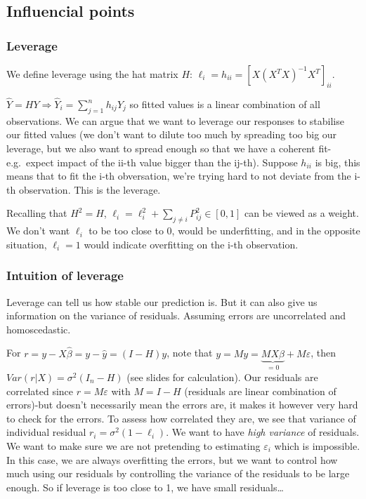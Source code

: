 \documentclass[
]{article}
\begin{document}
\hypertarget{influencial-points}{%
\subsection{Influencial points}\label{influencial-points}}

\hypertarget{leverage}{%
\subsubsection{Leverage}\label{leverage}}

We define leverage using the hat matrix \(H\):
\(\ell_i=h_{ii}=[X(X^T X)^{-1}X^T]_{ii}\).

\(\hat{Y}=HY\Rightarrow\hat{Y}_i=\sum_{j=1}^n h_{ij}Y_j\) so fitted
values is a linear combination of all observations. We can argue that we
want to leverage our responses to stabilise our fitted values (we don't
want to dilute too much by spreading too big our leverage, but we also
want to spread enough so that we have a coherent fit-e.g.~expect impact
of the ii-th value bigger than the ij-th). Suppose \(h_{ii}\) is big,
this means that to fit the i-th obversation, we're trying hard to not
deviate from the i-th observation. This is the leverage.

Recalling that \(H^2=H\),
\(\ell_i=\ell_i^2+\sum_{j\neq i}P_{ij}^2\in [0,1]\) can be viewed as a
weight. We don't want \(\ell_i\) to be too close to 0, would be
underfitting, and in the opposite situation, \(\ell_i=1\) would indicate
overfitting on the i-th observation.

\hypertarget{intuition-of-leverage}{%
\subsubsection{Intuition of leverage}\label{intuition-of-leverage}}

Leverage can tell us how stable our prediction is. But it can also give
us information on the variance of residuals. Assuming errors are
uncorrelated and homoscedastic.

For \(r=y-X\hat{\beta}=y-\hat{y}=(I-H)y\), note that
\(y=My=\underbrace{MX\beta}_{=0}+M\varepsilon\), then
\(Var(r|X)=\sigma^2(I_n-H)\) (see slides for calculation). Our residuals
are correlated since \(r=M\varepsilon\) with \(M=I-H\) (residuals are
linear combination of errors)-but doesn't necessarily mean the errors
are, it makes it however very hard to check for the errors. To assess
how correlated they are, we see that variance of individual residual
\(r_i=\sigma^2 (1-\ell_i)\). We want to have \emph{high variance} of
residuals. We want to make sure we are not pretending to estimating
\(\varepsilon_i\) which is impossible. In this case, we are always
overfitting the errors, but we want to control how much using our
residuals by controlling the variance of the residuals to be large
enough. So if leverage is too close to 1, we have small
residuals\ldots{}
\end{document}
